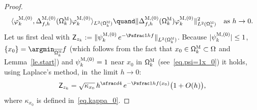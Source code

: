 \begin{proof}
\vspace*{-\baselineskip}
\[
\langle \varphi^{\textsc{M},(0)}_k,\Delta_{f,h}^{\textsc{M}, (0)}(\mathsf \Omega_k^{\textsc{M}}) \varphi^{\textsc{M},(0)}_k \rangle_{L^2(\mathsf \Omega_k^{\textsc{M}})}\quand\Vert \Delta_{f,h}^{\textsc{M}, (0)}(\mathsf \Omega_k^{\textsc{M}})\varphi^{\textsc{M},(0)}_k \Vert_{L^2(\mathsf \Omega_k^{\textsc{M}})}^2\quad\text{as $h\to 0$.}
\]
Let us first deal with $\mathsf Z_{z_k}:=\Vert \psi^{\textsc{M},(0)}_k\, e^{-\Psfrac 1hf} \Vert_{L^2(\mathsf \Omega_k^{\textsc{M}})} $. Because $|\psi^{\textsc{M},(0)}_k|\le 1$, $\{x_0\}= \argmin_{\overline{\mathsf \Omega_k^{\textsc{M}}}} f$ (which follows from the fact that $x_0\in \mathsf \Omega_k^{\textsc{M}} \subset \Omega$ and Lemma~\ref{le.start}) and $\psi^{\textsc{M},(0)}_k=1$ near $x_0$ in $\mathsf \Omega_k^{\textsc{M}}$ (see~\eqref{eq.psi=1x_0})
it holds, using Laplace's method, in~the limit $h\to 0$:
\begin{equation}\label{lap.x0K}
\mathsf Z_{z_k}= \sqrt{\kappa_{x_0}}\, h^{\sfrac d4}\, e^{-\Psfrac 1h f(x_0)} \bigl(1+O(h)\bigr),
\end{equation}
where $\kappa_{x_0}$ is defined in~\eqref{eq.kappa_0}.


\end{proof}
